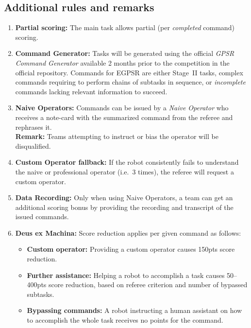 %
%
\subsection*{Additional rules and remarks}
\begin{enumerate}[nosep]
	\item \textbf{Partial scoring:} The main task allows partial (per \emph{completed} command) scoring.
	\item \textbf{Command Generator:} Tasks will be generated using the official \emph{GPSR Command Generator} available 2 months prior to the competition in the official repository. Commands for EGPSR are either Stage~II tasks, complex commands requiring to perform chains of subtasks in sequence, or \emph{incomplete} commands lacking relevant information to succeed.

	\item \textbf{Naive Operators:} Commands can be issued by a \emph{Naive Operator} who receives a note-card with the summarized command from the referee and rephrases it.\\[0pt]
	\textbf{Remark:} Teams attempting to instruct or bias the operator will be disqualified.

	\item \textbf{Custom Operator fallback:} If the robot consistently fails to understand the naive or professional operator (i.e.~3 times), the referee will request a custom operator.

	\item \textbf{Data Recording:} Only when using Naive Operators, a team can get an additional scoring bonus by providing the recording and transcript of the issued commands.

	\item \textbf{Deus ex Machina:} Score reduction applies per given command as follows:
	\begin{itemize}[nosep]
	\item \textbf{Custom operator:} Providing a custom operator causes 150pts score reduction.
	\item \textbf{Further assistance:} Helping a robot to accomplish a task causes 50--400pts score reduction, based on referee criterion and number of bypassed subtasks.
	\item \textbf{Bypassing commands:} A robot instructing a human assistant on how to accomplish the whole task receives no points for the command.
	\end{itemize}


\end{enumerate}
